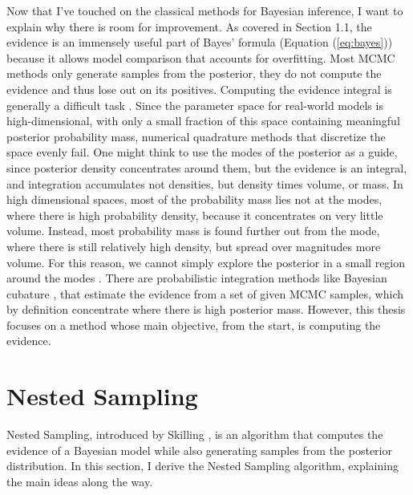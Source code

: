 \documentclass[12pt, a4paper]{report}
\begin{document}
Now that I've touched on the classical methods for Bayesian inference, I want to explain why there is room for improvement.
As covered in Section 1.1, the evidence is an immensely useful part of Bayes' formula (Equation (\ref{eq:bayes})) because it allows model comparison that accounts for overfitting.
Most MCMC methods only generate samples from the posterior, they do not compute the evidence and thus lose out on its positives.
Computing the evidence integral is generally a difficult task \cite[221]{mcelreath}.
Since the parameter space for real-world models is high-dimensional, with only a small fraction of this space containing meaningful posterior probability mass, numerical quadrature methods that discretize the space evenly fail.
One might think to use the modes of the posterior as a guide, since posterior density concentrates around them, but the evidence is an integral, and integration accumulates not densities, but density times volume, or mass.
In high dimensional spaces, most of the probability mass lies not at the modes, where there is high probability density, because it concentrates on very little volume.
Instead, most probability mass is found further out from the mode, where there is still relatively high density, but spread over magnitudes more volume.
For this reason, we cannot simply explore the posterior in a small region around the modes \cite{betancourt_talk}.
There are probabilistic integration methods like Bayesian cubature \cite{bayesian_cubature}, that estimate the evidence from a set of given MCMC samples, which by definition concentrate where there is high posterior mass.
However, this thesis focuses on a method whose main objective, from the start, is computing the evidence.


\section{Nested Sampling}
Nested Sampling, introduced by Skilling \cite{skilling}, is an algorithm that computes the evidence of a Bayesian model while also generating samples from the posterior distribution.
In this section, I derive the Nested Sampling algorithm, explaining the main ideas along the way.

\FloatBarrier
\end{document}
